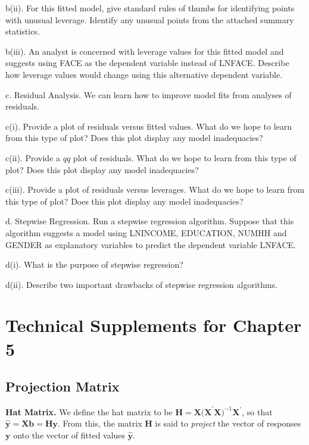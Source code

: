 \begin{exercises}
b(ii). For this fitted model, give standard rules of thumbs for
identifying points with unusual leverage. Identify any unusual
points from the attached summary statistics.

b(iii). An analyst is concerned with leverage values for this fitted
model and suggests using FACE as the dependent variable instead of
LNFACE. Describe how leverage values would change using this
alternative dependent variable.


c. Residual Analysis. We can learn how to improve model fits from
analyses of residuals.

c(i). Provide a plot of residuals versus fitted values. What do we
hope to learn from this type of plot? Does this plot display any
model inadequacies?

c(ii). Provide a $qq$ plot of residuals. What do we hope to learn
from this type of plot? Does this plot display any model
inadequacies?

c(iii). Provide a plot of residuals versus leverages. What do we
hope to learn from this type of plot? Does this plot display any
model inadequacies?


d. Stepwise Regression. Run a stepwise regression algorithm. Suppose
that this algorithm suggests a model using LNINCOME, EDUCATION,
NUMHH and GENDER as explanatory variables to predict the dependent
variable LNFACE.

d(i). What is the purpose of stepwise regression?

d(ii). Describe two important drawbacks of stepwise regression
algorithms.



\end{exercises}



\bigskip

\bigskip
\setcounter{equation}{13}
\section{Technical Supplements for Chapter 5}\label{S5:TechSupps}

\subsection{Projection Matrix}\label{S5:ProjMatrix}

\textbf{Hat Matrix.} We define the hat matrix to be $\mathbf{H} =
\mathbf{X(X}^{\prime}\mathbf{X)}^{-1} \mathbf{X}^{\prime}$, so that
$\mathbf{\hat{y}} = \mathbf{X b} =\mathbf{Hy}$. From this, the
matrix $\mathbf{H}$ is said to \textit{project} the vector of
responses $ \mathbf{y}$ onto the vector of fitted values
$\mathbf{\hat{y}}$.



